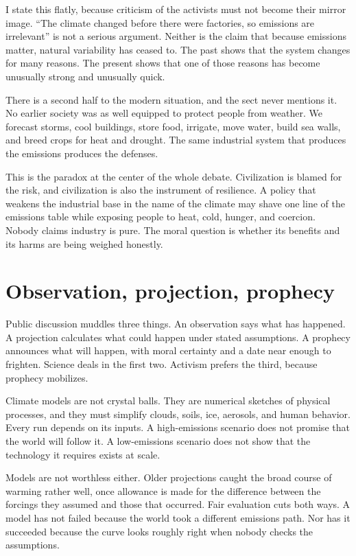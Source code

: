 \documentclass[12pt,a4paper]{book}
\begin{document}
I state this flatly, because criticism of the activists must not become their mirror image. ``The climate changed before there were factories, so emissions are irrelevant'' is not a serious argument. Neither is the claim that because emissions matter, natural variability has ceased to. The past shows that the system changes for many reasons. The present shows that one of those reasons has become unusually strong and unusually quick.

There is a second half to the modern situation, and the sect never mentions it. No earlier society was as well equipped to protect people from weather. We forecast storms, cool buildings, store food, irrigate, move water, build sea walls, and breed crops for heat and drought. The same industrial system that produces the emissions produces the defenses.

This is the paradox at the center of the whole debate. Civilization is blamed for the risk, and civilization is also the instrument of resilience. A policy that weakens the industrial base in the name of the climate may shave one line of the emissions table while exposing people to heat, cold, hunger, and coercion. Nobody claims industry is pure. The moral question is whether its benefits and its harms are being weighed honestly.

\section{Observation, projection, prophecy}

Public discussion muddles three things. An observation says what has happened. A projection calculates what could happen under stated assumptions. A prophecy announces what will happen, with moral certainty and a date near enough to frighten. Science deals in the first two. Activism prefers the third, because prophecy mobilizes.

Climate models are not crystal balls. They are numerical sketches of physical processes, and they must simplify clouds, soils, ice, aerosols, and human behavior. Every run depends on its inputs. A high-emissions scenario does not promise that the world will follow it. A low-emissions scenario does not show that the technology it requires exists at scale.

Models are not worthless either. Older projections caught the broad course of warming rather well, once allowance is made for the difference between the forcings they assumed and those that occurred. Fair evaluation cuts both ways. A model has not failed because the world took a different emissions path. Nor has it succeeded because the curve looks roughly right when nobody checks the assumptions.
\end{document}
